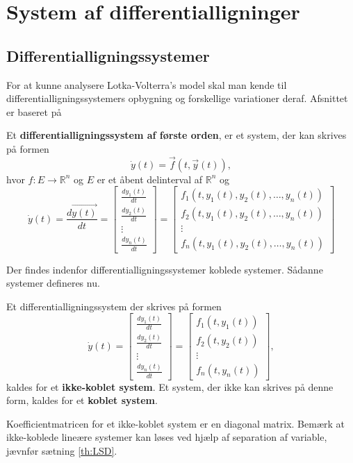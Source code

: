 \chapter{System af differentialligninger}

\section{Differentialligningssystemer}
For at kunne analysere Lotka-Volterra's model skal man kende til differentialligningssystemers opbygning og forskellige variationer deraf. Afsnittet er baseret på \citep[afsnit 1.1 og 2.1]{Perko}

\begin{definition} \label{ikke-lin.diff}
Et \textbf{differentialligningssystem af første orden}, er et system, der kan skrives på formen
$$\dot{y}(t)=\vec{f}(t, \vec{y}(t)),$$
hvor $f: E \to \mathbb{R}^n$ og $E$ er et åbent delinterval af $\mathbb{R}^n$ og
$$\dot{y}(t) = \frac{d\vec{y(t)}}{dt} = 
\begin{bmatrix}
\frac{dy_1(t)}{dt} \\
\frac{dy_2(t)}{dt}\\
\vdots \\
\frac{dy_n(t)}{dt}
\end{bmatrix}
=
\begin{bmatrix}
f_1(t, y_1(t), y_2(t), \hdots, y_n(t))\\
f_2(t, y_1(t), y_2(t), \hdots, y_n(t))\\
\vdots \\
f_n(t, y_1(t), y_2(t), \hdots, y_n(t))
\end{bmatrix}$$
\end{definition}

Der findes indenfor differentialligningssystemer koblede systemer. Sådanne systemer defineres nu.

\begin{definition} \label{ikke-kobletsystem}
Et differentialligningssystem der skrives på formen
$$\dot{y}(t)=\begin{bmatrix}
\frac{dy_1(t)}{dt} \\
\frac{dy_2(t)}{dt}\\
\vdots \\
\frac{dy_n(t)}{dt}
\end{bmatrix}=\begin{bmatrix}
f_1(t, y_1(t))\\
f_2(t, y_2(t))\\
\vdots \\
f_n(t, y_n(t))
\end{bmatrix},$$
kaldes for et \textbf{ikke-koblet system}. Et system, der ikke kan skrives på denne form, kaldes for et \textbf{koblet system}.
\end{definition}
Koefficientmatricen for et ikke-koblet system er en diagonal matrix. Bemærk at ikke-koblede lineære systemer kan løses ved hjælp af separation af variable, jævnfør sætning \ref{th:LSD}.

